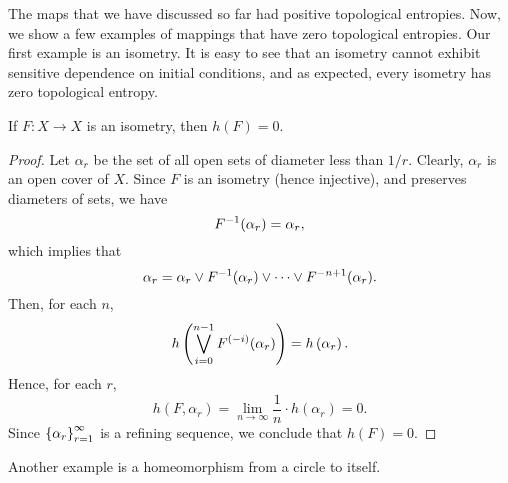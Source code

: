 \documentclass[10pt,twoside,draft]{book}
\begin{document}
The maps that we have discussed so far had positive topological entropies.
Now, we show a few examples of mappings that have zero topological entropies.
Our first example is an isometry.
It is easy to see that an isometry cannot exhibit sensitive dependence on initial conditions, and as expected, every isometry has zero topological entropy.
\begin{proposition}
  \citep{akm}
  If $F: X \to X$ is an isometry, then $h(F) = 0$.
  \begin{proof}
    Let $\alpha_r$ be the set of all open sets of diameter less than $1/r$.
    Clearly, $\alpha_r$ is an open cover of $X$.
    Since $F$ is an isometry (hence injective), and preserves diameters of sets, we have
    \begin{equation*}
      F^{-1}(\alpha_r) = \alpha_r,
    \end{equation*}
    which implies that
    \begin{equation*}
      \alpha_r = \alpha_r \vee F^{-1}(\alpha_r) \vee \cdots \vee F^{-n+1}(\alpha_r).
    \end{equation*}
    Then, for each $n$,
    \begin{equation*}
      h\left (  \bigvee\limits_{i=0}^{n-1} F^{(-i)}(\alpha_r)  \right )   
      = h\left ( \alpha_r \right ).
    \end{equation*}
    Hence, for each $r$,
    \begin{equation*}
      h(F, \alpha_r)
      = \lim\limits_{n \to \infty} \frac{1}{n} \cdot h(\alpha_r)
      = 0.
    \end{equation*}
    Since $\left \{ \alpha_r \right \}^{\infty}_{r = 1}$ is a refining sequence, we conclude that $h(F) = 0$.
  \end{proof}
\end{proposition}
Another example is a homeomorphism from a circle to itself.
\end{document}
